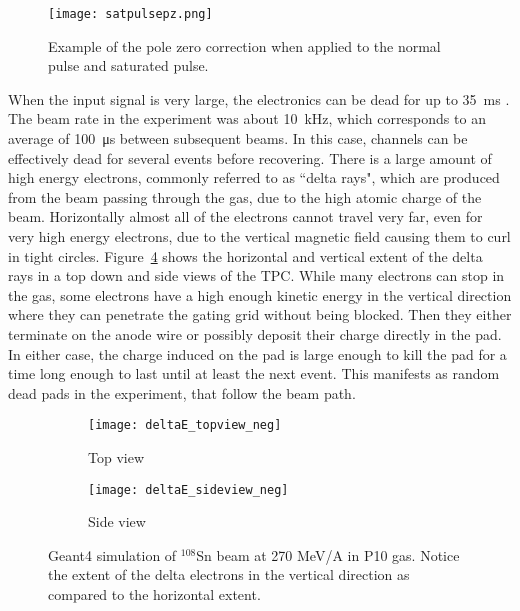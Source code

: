 \begin{figure}[!htb]
\centering
\texttt{[image: satpulsepz.png]} 
\caption{Example of the pole zero correction when applied to the normal pulse and saturated pulse.} 
\label{fig:pulseSatTag}
\end{figure}


When the input signal is very large, the electronics can be dead for up to \SI{35}{\milli\second} \cite{akiGET}. The beam rate in the experiment was about \SI{10}{\kilo\hertz}, which corresponds to an average of \SI{100}{\micro\second} between subsequent beams. In this case, channels can be effectively dead for several events before recovering. There is a large amount of high energy electrons, commonly referred to as ``delta rays",  which are produced from the beam passing through the gas, due to the high atomic charge of the beam. Horizontally almost all of the electrons cannot travel very far, even for very high energy electrons, due to the vertical magnetic field causing them to curl in tight circles. Figure~\ref{fig:deltaE} shows the horizontal and vertical extent of the delta rays in a top down and side views of the TPC. While many electrons can stop in the gas, some electrons have a high enough kinetic energy in the vertical direction where they can penetrate the gating grid without being blocked. Then they either terminate on the anode wire or possibly deposit their charge directly in the pad. In either case, the charge induced on the pad is large enough to kill the pad for a time long enough to last until at least the next event. This manifests as random dead pads in the experiment, that follow the beam path.  


\begin{figure}[!htb]
    \centering
    \begin{subfigure}[t]{0.49\textwidth}
        \centering
        \texttt{[image: deltaE\_topview\_neg]} 
        \caption{Top view} \label{fig:deltaE_topview}
    \end{subfigure}
    \hfill
    \begin{subfigure}[t]{0.49\textwidth}
        \centering
        \texttt{[image: deltaE\_sideview\_neg]} 
        \caption{Side view} \label{fig:deltaE_sideview}
    \end{subfigure}
    \caption{Geant4 simulation of ${}^{108}$Sn beam at 270 MeV/A in P10 gas. Notice the extent of the delta electrons in the vertical direction as compared to the horizontal extent. }
\label{fig:deltaE}
\end{figure}


